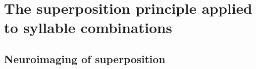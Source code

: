 \section{The superposition principle applied to syllable combinations}

\subsection{Neuroimaging of superposition}



